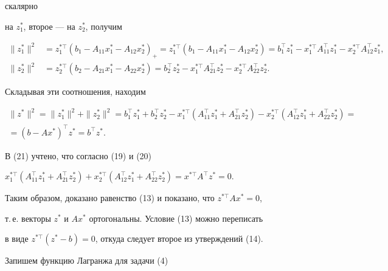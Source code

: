 \begin{pf}
скалярно


на $z^*_1$, второе --- на $z^*_2$, получим


\begin{align*}


\|z^*_1\|^2&=z^{*\top}


_1(b_1-A_{11}x^*_1-A_{12}x^*_2)_+=z^{*\top}_1(b_1-A_{11}x^*_1-


A_{12}x^*_2)=


b^\top_1 z^*_1-x^{*\top}_1A^\top_{11}z^*_1-x^{*\top}_2


A^\top_{12}z^*_1,\\


%


\|z^*_2\|^2&=z^{*\top}_2(b_2-A_{21}x^*_1-A_{22}x^*_2)=


b^\top_2 z^*_2-x^{*\top}_1A^\top_{21}z^*_2-


x^{*\top}_2A^\top_{22}z^*_2.


\end{align*}


Складывая эти соотношения, находим


\begin{multline}


\|z^*\|^2=\|z^*_1\|^2+\|z^*_2\|^2=b^\top_1 z^*_1+


b^\top_2z^*_2-x^{*\top}_1(A^\top_{11}z^*_1+A^\top_{21}z^*_2)-


x^{*\top}_2(A^\top_{12}z^*_1+A^\top_{22}z^*_2)=\\


=(b-Ax^*)^\top z^*=b^\top z^*.


\end{multline}


В (21) учтено, что согласно (19) и (20)


$x^{*\top}_1(A^\top_{11}z^*_1+A^\top_{21}z^*_2) 


+x^{*\top}_2(A^\top_{12}z^*_1+A^\top_{22}z^*_2)= x^{*\top}A^\top z^*=0$.


Таким образом, доказано равенство (13) и показано, что $z^{*\top}Ax^*=0$,


т.\,е. векторы $z^*$ и $Ax^*$ ортогональны. Условие (13) можно переписать


в виде $z^{*\top}(z^*-b)=0$, откуда следует второе из утверждений (14).





Запишем функцию Лагранжа для задачи (4)


\begin{equation}



\end{equation}
\end{pf}
